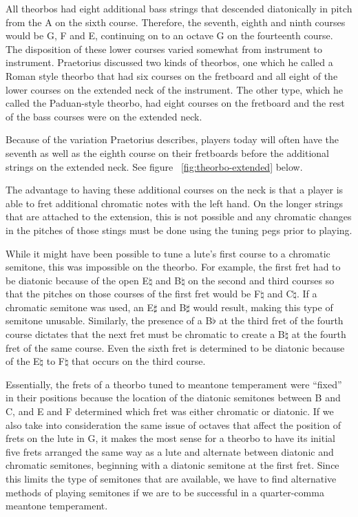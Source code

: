 All theorbos had eight additional bass strings that descended diatonically in pitch from
the A on the sixth course.  Therefore, the seventh, eighth and ninth courses would be G, F
and E, continuing on to an octave G on the fourteenth course.  The disposition of these
lower courses varied somewhat from instrument to instrument.  Praetorius discussed two
kinds of theorbos, one which he called a Roman style theorbo that had six courses on the
fretboard and all eight of the lower courses on the extended neck of the
instrument.\autocite[59]{MP:1} The other type, which he called the Paduan-style
theorbo, had eight courses on the fretboard and the rest of the bass courses were on the
extended neck.

Because of the variation Praetorius describes, players today will often have the seventh
as well as the eighth course on their fretboards before the additional strings on the
extended neck. See figure ~\ref{fig:theorbo-extended} below.

The advantage to having these additional courses on the neck is that a
player is able to fret additional chromatic notes with the left hand.  On the longer
strings that are attached to the extension, this is not possible and any chromatic changes
in the pitches of those stings must be done using the tuning pegs prior to playing.

While it might have been possible to tune a lute's first course to a chromatic semitone,
this was impossible on the theorbo. For example, the first fret had to be diatonic because
of the open E$\natural$ and B$\natural$ on the second and third courses so that the
pitches on those courses of the first fret would be F$\natural$ and C$\natural$.  If a
chromatic semitone was used, an E$\sharp$ and B$\sharp$ would result, making this type of
semitone unusable. Similarly, the presence of a B$\flat$ at the third fret of the fourth
course dictates that the next fret must be chromatic to create a B$\natural$ at the fourth
fret of the same course. Even the sixth fret is determined to be diatonic because of the
E$\natural$ to F$\natural$ that occurs on the third course.

Essentially, the frets of a theorbo tuned to meantone temperament were ``fixed'' in
their positions because the location of the diatonic semitones between B and C, and E
and F determined which fret was either chromatic or diatonic.  If we also take into
consideration the same issue of octaves that affect the position of frets on the lute
in G, it makes the most sense for a theorbo to have its initial five frets arranged the
same way as a lute and alternate between diatonic and chromatic semitones, beginning
with a diatonic semitone at the first fret.  Since this limits the type of semitones
that are available, we have to find alternative methods of playing semitones if we are
to be successful in a quarter-comma meantone temperament.

